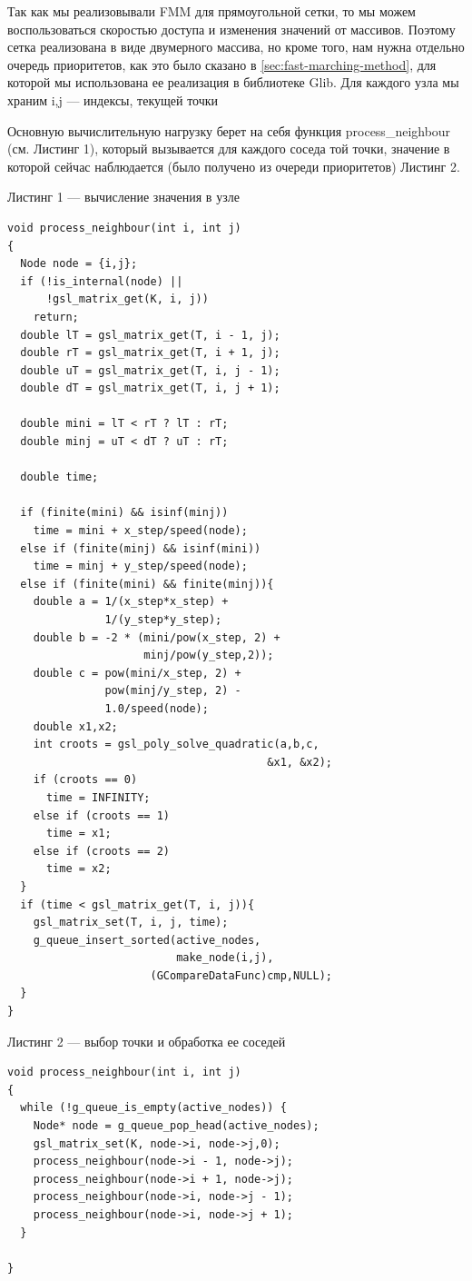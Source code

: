 Так как мы реализовывали FMM для прямоугольной сетки, то мы можем
воспользоваться скоростью доступа и изменения значений от
массивов. Поэтому сетка реализована в виде двумерного массива, но
кроме того, нам нужна отдельно очередь приоритетов, как это было
сказано в \ref{sec:fast-marching-method}, для которой мы использована
ее реализация в библиотеке Glib. Для каждого узла мы храним i,j ---
индексы, текущей точки

Основную вычислительную нагрузку берет на себя функция
process\_neighbour (см. Листинг 1), который вызывается для каждого соседа той точки,
значение в которой сейчас наблюдается (было получено из очереди
приоритетов) Листинг 2.

\vspace{1em}
Листинг 1 --- вычисление значения в узле 
\normalsize
\begin{verbatim} 
void process_neighbour(int i, int j)
{
  Node node = {i,j};
  if (!is_internal(node) || 
      !gsl_matrix_get(K, i, j)) 
    return;
  double lT = gsl_matrix_get(T, i - 1, j);
  double rT = gsl_matrix_get(T, i + 1, j);
  double uT = gsl_matrix_get(T, i, j - 1);
  double dT = gsl_matrix_get(T, i, j + 1);

  double mini = lT < rT ? lT : rT;
  double minj = uT < dT ? uT : rT;

  double time;

  if (finite(mini) && isinf(minj))
    time = mini + x_step/speed(node);
  else if (finite(minj) && isinf(mini))
    time = minj + y_step/speed(node);
  else if (finite(mini) && finite(minj)){
    double a = 1/(x_step*x_step) + 
               1/(y_step*y_step);
    double b = -2 * (mini/pow(x_step, 2) +
                     minj/pow(y_step,2));
    double c = pow(mini/x_step, 2) + 
               pow(minj/y_step, 2) - 
               1.0/speed(node);
    double x1,x2;
    int croots = gsl_poly_solve_quadratic(a,b,c, 
                                        &x1, &x2);
    if (croots == 0)
      time = INFINITY;
    else if (croots == 1)
      time = x1;
    else if (croots == 2)
      time = x2;
  }
  if (time < gsl_matrix_get(T, i, j)){
    gsl_matrix_set(T, i, j, time);
    g_queue_insert_sorted(active_nodes,
                          make_node(i,j),
                      (GCompareDataFunc)cmp,NULL);
  }
}
\end{verbatim}
\large


\vspace{1em}
Листинг 2 --- выбор точки и обработка ее соседей
\normalsize
\begin{verbatim} 
void process_neighbour(int i, int j)
{
  while (!g_queue_is_empty(active_nodes)) {
    Node* node = g_queue_pop_head(active_nodes);
    gsl_matrix_set(K, node->i, node->j,0);
    process_neighbour(node->i - 1, node->j);
    process_neighbour(node->i + 1, node->j);
    process_neighbour(node->i, node->j - 1);
    process_neighbour(node->i, node->j + 1);
  }

}
\end{verbatim}
\large



